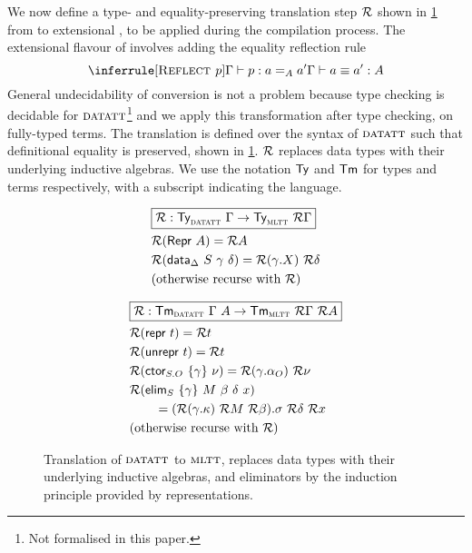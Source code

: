 We now define a type- and equality-preserving translation step $\mathcal{R}$ shown in
\cref{fig:translation} from \lambdadata to extensional \langmltt, to be
applied during the compilation process. The extensional flavour of \lambdamltt
involves adding the equality reflection rule
\[
\inferrule[\axiom{Reflect $p$}]{\Gamma \vdash p : a =_A a'}{\Gamma \vdash a \equiv a' : A}
\]
General undecidability of conversion is not a problem because type checking is
decidable for ${\textsc{datatt}}$\footnote{Not formalised in this paper.} and we
apply this transformation after type checking, on fully-typed terms. The
translation is defined over the syntax of ${\textsc{datatt}}$ \cite{Boulier2017-cm}
such that definitional equality is preserved, shown in
\cref{fig:translation}. $\mathcal{R}$ replaces data types with their underlying inductive
algebras. We use the notation $\textsf{Ty}$ and $\textsf{Tm}$ for types and terms respectively,
with a subscript indicating the language.

\begin{figure}
\begin{minipage}[t]{0.5\textwidth}
\begin{align*}
&\boxed{\mathcal{R} : \textsf{Ty}_{{\textsc{datatt}}}\ \Gamma \to \textsf{Ty}_{{\textsc{mltt}}}\ \mathcal{R} \Gamma} \\
&\mathcal{R} (\textsf{Repr}\ A) = \mathcal{R} A \\
&\mathcal{R} (\textsf{data}_{\Delta}\ S\ \gamma\ \delta) = \mathcal{R} (\gamma.X)\ \mathcal{R} \delta \\
&\text{(otherwise recurse with $\mathcal{R}$)}
\end{align*}
\end{minipage}%
\begin{minipage}[t]{0.5\textwidth}
\begin{align*}
&\boxed{\mathcal{R} : \textsf{Tm}_{{\textsc{datatt}}}\ \Gamma\ A \to \textsf{Tm}_{{\textsc{mltt}}}\ \mathcal{R} \Gamma\ \mathcal{R} A} \\
&\mathcal{R} (\textsf{repr}\ t) = \mathcal{R} t \\
&\mathcal{R} (\textsf{unrepr}\ t) = \mathcal{R} t \\
&\mathcal{R} (\textsf{ctor}_{S.O}\ \{\gamma\}\ \nu) = \mathcal{R} (\gamma.\alpha_O)\ \mathcal{R}\nu \\
&\mathcal{R} (\textsf{elim}_{S}\ \{\gamma\}\ M\ \beta\ \delta\ x)  \\ &\qquad = (\mathcal{R} (\gamma.\kappa)\ \mathcal{R} M\ \mathcal{R} \beta).\sigma\ \mathcal{R}\delta\ \mathcal{R} x \\
&\text{(otherwise recurse with $\mathcal{R}$)}
\end{align*}
\end{minipage}
\caption{Translation of ${\textsc{datatt}}$ to ${\textsc{mltt}}$, replaces data types
with their underlying inductive algebras, and eliminators by the induction
principle provided by representations.}
\label{fig:translation}
\end{figure}

